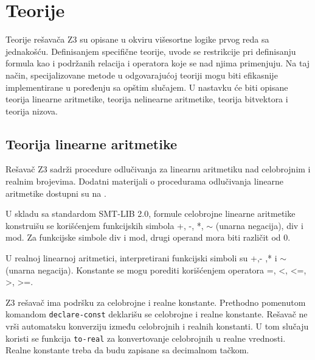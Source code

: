 \documentclass[12pt,oneside]{memoir}
\begin{document}

\section{Teorije} \label{sec:num2}
Teorije rešavača Z3 su opisane u okviru višesortne logike prvog reda sa jednakošću.  Definisanjem specifične teorije, uvode se restrikcije pri definisanju formula kao i podržanih relacija i operatora koje se nad njima primenjuju. Na taj način, specijalizovane metode u odgovarajućoj teoriji mogu biti efikasnije implementirane u poređenju sa opštim slučajem. U nastavku će biti opisane teorija linearne aritmetike, teorija nelinearne aritmetike, teorija bitvektora i teorija nizova.

\subsection{Teorija linearne aritmetike} 

Rešavač Z3 sadrži procedure odlučivanja za linearnu aritmetiku nad celobrojnim i realnim brojevima. Dodatni materijali o procedurama odlučivanja linearne aritmetike dostupni su na \cite{FastLinearArithmetic}.
\par

U skladu sa standardom SMT-LIB 2.0, formule celobrojne linearne aritmetike konstruišu se korišćenjem funkcijskih simbola +, -, *, $\sim$ (unarna negacija), div i mod. Za funkcijske simbole div i mod, drugi operand mora biti različit od 0. 

U realnoj linearnoj aritmetici, interpretirani funkcijski simboli su +,- ,* i $\sim$(unarna negacija). Konstante se mogu porediti korišćenjem operatora =, <, <=, >, >=. 
\\
\par
Z3 rešavač ima podršku za celobrojne i realne konstante. Prethodno pomenutom komandom \texttt{declare-const} deklarišu se celobrojne i realne konstante. Rešavač ne vrši automatsku konverziju između celobrojnih i realnih konstanti. U tom slučaju koristi se funkcija \texttt{to-real} za konvertovanje celobrojnih u realne vrednosti.
Realne konstante treba da budu zapisane sa decimalnom tačkom.
\end{document}

